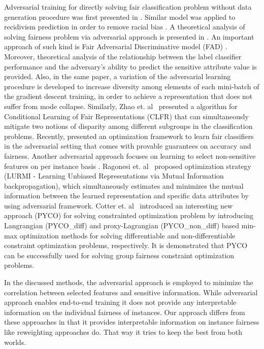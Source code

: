 \documentclass[preprint,12pt]{elsarticle}
\begin{document}
Adversarial training for directly solving fair classification problem without data generation procedure was first presented in \cite{zhang2018mitigating}. Similar model was applied to recidivism prediction in order to remove racial bias \cite{wadsworth2018achieving, teo2021measuring}.
A theoretical analysis of solving fairness problem via adversarial approach is presented in \cite{madras2018learning}. 
An important approach of such kind is Fair Adversarial Discriminative model (FAD) \cite{adel2019one}. Moreover, theoretical analysis of the relationship between the label classifier performance and the adversary’s ability to predict the sensitive attribute value is provided. Also, in the same paper, a variation of the adversarial learning procedure is developed to increase diversity among elements of each mini-batch of the gradient descent training, in order to achieve a representation that does not suffer from mode collapse. Similarly, Zhao et. al~\cite{zhao2019conditional} presented a algorithm for Conditional Learning of Fair Representations (CLFR) that can simultaneously mitigate two notions of disparity among different subgroups in the classification problems. Recently, \cite{celis2021fair} presented an optimization framework to learn fair classifiers in the adversarial setting that comes with provable guarantees on accuracy and fairness.
Another adversarial approach focuses on learning to select non-sensitive features on per instance basis \cite{wang2019approaching}. 
Ragonesi et. al~\cite{ragonesi2021learning} proposed optimization strategy (LURMI - Learning Unbiased Representations via Mutual Information backpropagation), which simultaneously estimates and minimizes the mutual information between the learned representation and specific data attributes by using adversarial framework.
Cotter et. al~\cite{cotter2019optimization} introduced an interesting new approach (PYCO) for solving constrainted optimization problem by introducing Langrangian (PYCO\_diff) and proxy-Lagrangian (PYCO\_non\_diff) based min-max optimization methods for solving differentiable and non-differentiable constraint optimization problems, respectively. It is demonstrated that PYCO can be successfully used for solving group fairness constraint optimization problems. 


In the discussed methods, the adversarial approach is employed to minimize the correlation between selected features and sensitive information. While adversarial approach enables end-to-end training it does not provide any interpretable information on the individual fairness of instances. Our approach differs from these approaches in that it provides interpretable information on instance fairness like reweighting approaches do. That way it tries to keep the best from both worlds.
\end{document}
